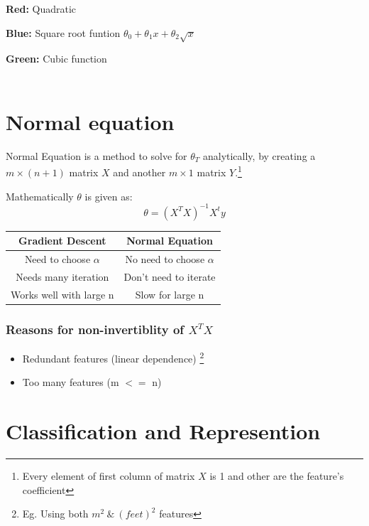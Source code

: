 \documentclass[12pt, A4]{report}
\begin{document}
    \textbf{Red:} Quadratic

    \textbf {Blue:} Square root funtion $ \theta_0+\theta_1x+\theta_2\sqrt{x} $

    \textbf {Green:} Cubic function
\\ \\

\section*{Normal equation}
  Normal Equation is a method to solve for $\theta_T$ analytically, by creating a $m\times(n+1)$ matrix $X$ and another $m\times1$ matrix $Y$.\footnote[2]{Every element of first column of matrix $X$ is 1 and other are the feature's coefficient}

  Mathematically $\theta$ is given as:
  \begin{equation} \label {eq: theta}
    \theta = (X^TX)^{-1}X^ty
  \end{equation}

  \begin{tabular}{ |c|c|}
    \hline
    \textbf{Gradient Descent} & \textbf{Normal Equation} \\
    \hline
    Need to choose $\alpha$ & No need to choose $\alpha$ \\
    Needs many iteration & Don't need to iterate \\
    Works well with large n & Slow for large n \\
    \hline
  \end{tabular}

  \vspace{5mm}

  \subsubsection*{Reasons for non-invertiblity of $X^T X$}
    \begin{itemize}
        \item Redundant features (linear dependence) \footnote[3]{Eg. Using both $m^2 \  \& \  (feet)^2$ features}
        \item Too many features (m $<=$ n) 
    \end{itemize}

\section*{Classification and Represention}
\end{document}
